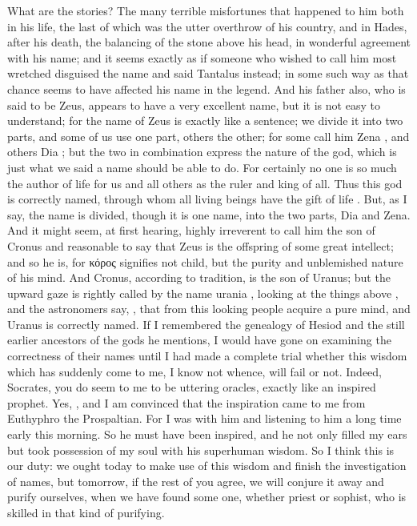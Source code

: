 \hermogenesspeaks
What are the stories?
\socratesspeaks
The many terrible misfortunes that happened to him both in his life, the last of which was the utter overthrow of his country, and in Hades, after his death,  the balancing  of the stone above his head, in wonderful agreement with his name; and it seems exactly as if someone who wished to call him most wretched  disguised the name and said Tantalus instead; in some such way as that chance seems to have affected his name in the legend. And his father also, who is said to be Zeus, appears to have a very excellent name, but it is not easy to understand;  for the name of Zeus is exactly like a sentence; we divide it into two parts, and some of us use one part, others the other; for some call him Zena , and others Dia ; but the two in combination express the nature of the god, which is just what we said a name should be able to do. For certainly no one is so much the author of life  for us and all others as the ruler and king of all.  Thus this god is correctly named, through whom  all living beings have the gift of life . But, as I say, the name is divided, though it is one name, into the two parts, Dia and Zena. And it might seem, at first hearing, highly irreverent to call him the son of Cronus and reasonable to say that Zeus is the offspring of some great intellect; and so he is, for κόρος  signifies not child, but the purity  and unblemished nature of his mind. And Cronus, according to tradition, is the son of Uranus; but the upward gaze is rightly called by the name urania ,  looking at the things above , and the astronomers say, \hermogenesspeaks, that from this looking people acquire a pure mind, and Uranus is correctly named. If I remembered the genealogy of Hesiod and the still earlier ancestors of the gods he mentions, I would have gone on examining the correctness of their names until I had made a complete trial whether this wisdom which has suddenly come to me, I know not whence,  will fail or not.
\hermogenesspeaks
Indeed, Socrates, you do seem to me to be uttering oracles, exactly like an inspired prophet.
\socratesspeaks
Yes, \hermogenesspeaks, and I am convinced that the inspiration came to me from Euthyphro the Prospaltian. For I was with him and listening to him a long time early this morning. So he must have been inspired, and he not only filled my ears but took possession of my soul with his superhuman wisdom. So I think this is our duty:  we ought today to make use of this wisdom and finish the investigation of names, but tomorrow, if the rest of you agree, we will conjure it away and purify ourselves, when we have found some one, whether priest or sophist,  who is skilled in that kind of purifying.
